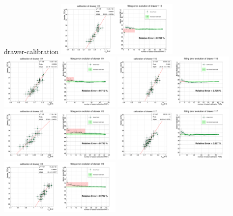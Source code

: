 \documentclass[11pt,compress,xcolor=x11names,UTF8]{beamer}
\begin{document}
\begin{frame}{drawer-calibration}
\vspace{-.5cm}
\includegraphics[width=0.45\textwidth]{sta101-12} 
\includegraphics[width=0.45\textwidth]{sta101-13} 
\includegraphics[width=0.45\textwidth]{sta101-14} 
\includegraphics[width=0.45\textwidth]{sta101-15} 
\includegraphics[width=0.45\textwidth]{sta101-16} 
\includegraphics[width=0.45\textwidth]{sta101-17} 
\end{frame}
\end{document}
